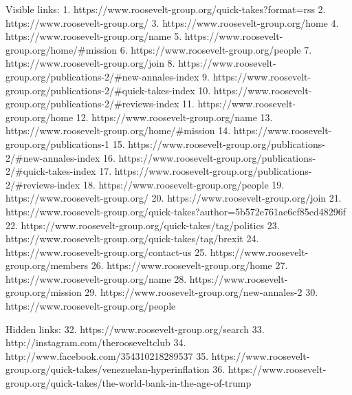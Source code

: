    Visible links:
   1. https://www.roosevelt-group.org/quick-takes?format=rss
   2. https://www.roosevelt-group.org/
   3. https://www.roosevelt-group.org/home
   4. https://www.roosevelt-group.org/name
   5. https://www.roosevelt-group.org/home/#mission
   6. https://www.roosevelt-group.org/people
   7. https://www.roosevelt-group.org/join
   8. https://www.roosevelt-group.org/publications-2/#new-annales-index
   9. https://www.roosevelt-group.org/publications-2/#quick-takes-index
  10. https://www.roosevelt-group.org/publications-2/#reviews-index
  11. https://www.roosevelt-group.org/home
  12. https://www.roosevelt-group.org/name
  13. https://www.roosevelt-group.org/home/#mission
  14. https://www.roosevelt-group.org/publications-1
  15. https://www.roosevelt-group.org/publications-2/#new-annales-index
  16. https://www.roosevelt-group.org/publications-2/#quick-takes-index
  17. https://www.roosevelt-group.org/publications-2/#reviews-index
  18. https://www.roosevelt-group.org/people
  19. https://www.roosevelt-group.org/
  20. https://www.roosevelt-group.org/join
  21. https://www.roosevelt-group.org/quick-takes?author=5b572e761ae6cf85cd48296f
  22. https://www.roosevelt-group.org/quick-takes/tag/politics
  23. https://www.roosevelt-group.org/quick-takes/tag/brexit
  24. https://www.roosevelt-group.org/contact-us
  25. https://www.roosevelt-group.org/members
  26. https://www.roosevelt-group.org/home
  27. https://www.roosevelt-group.org/name
  28. https://www.roosevelt-group.org/mission
  29. https://www.roosevelt-group.org/new-annales-2
  30. https://www.roosevelt-group.org/people

   Hidden links:
  32. https://www.roosevelt-group.org/search
  33. http://instagram.com/therooseveltclub
  34. http://www.facebook.com/354310218289537
  35. https://www.roosevelt-group.org/quick-takes/venezuelan-hyperinflation
  36. https://www.roosevelt-group.org/quick-takes/the-world-bank-in-the-age-of-trump
